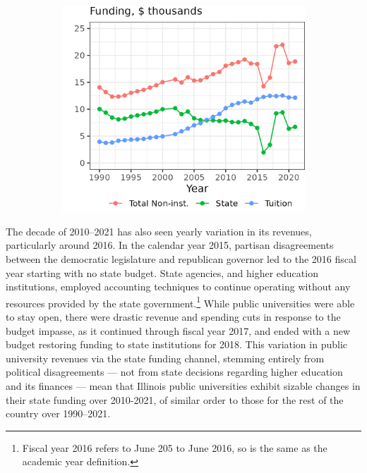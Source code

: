 \begin{figure}[h!]
\begin{subfigure}[b]{0.495\textwidth}
        \includegraphics[width=\textwidth]{figures/illinois-funding-fte.png}
        \label{fig:illinois-funding-fte}
    \end{subfigure}
    \label{fig:illinois-funding}
\end{figure}

The decade of 2010--2021 has also seen yearly variation in its revenues, particularly around 2016.
In the calendar year 2015, partisan disagreements between the democratic legislature and republican governor led to the 2016 fiscal year starting with no state budget.
State agencies, and higher education institutions, employed accounting techniques to continue operating without any resources provided by the state government.\footnote{
    Fiscal year 2016 refers to June 205 to June 2016, so is the same as the academic year definition.
}
While public universities were able to stay open, there were drastic revenue and spending cuts in response to the budget impasse, as it continued through fiscal year 2017, and ended with a new budget restoring funding to state institutions for 2018.
This variation in public university revenues via the state funding channel, stemming entirely from political disagreements --- not from state decisions regarding higher education and its finances \citep{young2020squandered} --- mean that Illinois public universities exhibit sizable changes in their state funding over 2010-2021, of similar order to those for the rest of the country over 1990--2021.
